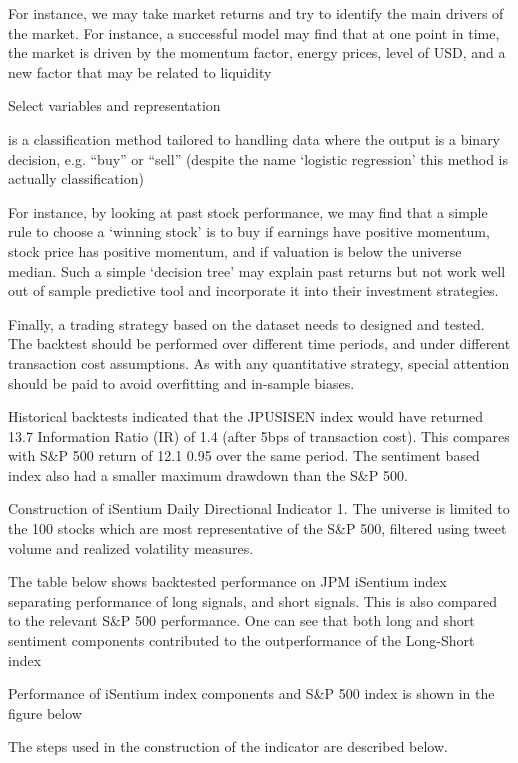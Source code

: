 \documentclass[a4paper]{article}
\begin{document}
For instance, we may take market returns and try to
identify the main drivers of the market. For instance, a successful model may find that at one point in time, the market is
driven by the momentum factor, energy prices, level of USD, and a new factor that may be related to liquidity

Select variables and representation

is a classification method tailored to handling data where the output is a
binary decision, e.g. “buy” or “sell” (despite the name ‘logistic regression’ this method is actually classification)

 For
instance, by looking at past stock performance, we may find that a simple rule to choose a ‘winning stock’ is to buy if
earnings have positive momentum, stock price has positive momentum, and if valuation is below the universe median. Such
a simple ‘decision tree’ may explain past returns but not work well out of sample predictive tool and incorporate it into their investment strategies.

Finally, a trading strategy based on the dataset needs to designed and
tested. The backtest should be performed over different time periods, and under different transaction cost assumptions. As
with any quantitative strategy, special attention should be paid to avoid overfitting and in-sample biases. 

Historical backtests indicated that the JPUSISEN index would have returned 13.7%
Information Ratio (IR) of 1.4 (after 5bps of transaction cost). This compares with S\&P 500 return of 12.1%
0.95 over the same period. The sentiment based index also had a smaller maximum drawdown than the S\&P 500.

Construction of iSentium Daily Directional Indicator
1. The universe is limited to the 100 stocks which are most representative of the S\&P 500, filtered using tweet volume
and realized volatility measures.

The table below shows backtested performance on JPM iSentium index separating performance of long signals, and short
signals. This is also compared to the relevant S\&P 500 performance. One can see that both long and short sentiment
components contributed to the outperformance of the Long-Short index

Performance of iSentium index components and S\&P 500 index is shown in the figure below

 The steps used in the construction of the indicator are described below.
 
\end{document}
